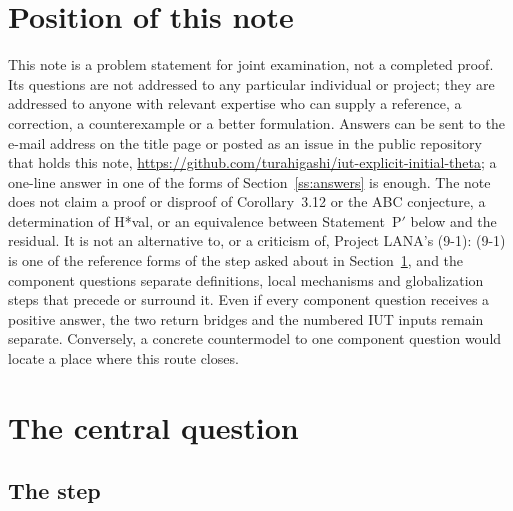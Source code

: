 \documentclass[11pt]{article}
\theoremstyle{definition}
\begin{document}
\section*{Position of this note}

This note is a problem statement for joint examination, not a
completed proof.  Its questions are not addressed to any particular
individual or project; they are addressed to anyone with relevant
expertise who can supply a reference, a correction, a
counterexample or a better formulation.  Answers can be sent to the
e-mail address on the title page or posted as an issue in the
public repository that holds this note,
\url{https://github.com/turahigashi/iut-explicit-initial-theta}; a one-line answer in one of
the forms of Section~\ref{ss:answers} is enough.  The note does not
claim a proof or disproof of Corollary~3.12 or the ABC conjecture, a
determination of H*val, or an equivalence between Statement~P$'$
below and the residual.  It is not an alternative to, or a
criticism of, Project LANA's (9-1): (9-1) is one of the reference
forms of the step asked about in Section~\ref{s:central}, and the
component questions separate definitions, local mechanisms and
globalization steps that precede or surround it.  Even if every
component question receives a positive answer, the two return
bridges and the numbered IUT inputs remain separate.  Conversely, a
concrete countermodel to one component question would locate a
place where this route closes.

\section{The central question}\label{s:central}

\subsection{The step}\label{ss:step}
\end{document}
